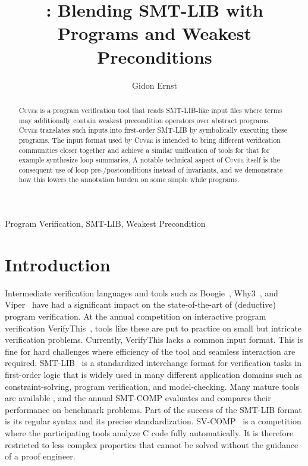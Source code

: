 \documentclass[fleqn]{llncs}
\title{\Cuvee: Blending SMT-LIB with \\ Programs and Weakest Preconditions}
\author{Gidon Ernst}
\institute{LMU Munich, Germany, \email{gidon.ernst@lmu.de}}
\newcommand{\Cuvee}{\textsc{Cuvée}\xspace}
\begin{document}
\maketitle

\begin{abstract}
\Cuvee is a program verification tool that reads SMT-LIB-like input files where terms may additionally contain weakest precondition operators over abstract programs.
\Cuvee translates such inputs into first-order SMT-LIB by symbolically executing these programs.
The input format used by \Cuvee is intended to bring different verification communities closer together and achieve a similar unification of tools for that for example synthesize loop summaries.
A notable technical aspect of \Cuvee itself is the consequent use of loop pre-/postconditions instead of invariants, and we demonstrate how this lowers the annotation burden on some simple while programs.
\end{abstract}

\begin{keywords}
Program Verification, SMT-LIB, Weakest Precondition
\end{keywords}

\section{Introduction}

Intermediate verification languages and tools such as Boogie~\cite{}, Why3~\cite{}, and Viper~\cite{}
have had a significant impact on the state-of-the-art of (deductive) program verification.
At the annual competition on interactive program verification VerifyThis~\cite{},
tools like these are put to practice on small but intricate verification problems.
Currently, VerifyThis lacks a common input format.
This is fine for hard challenges where efficiency of the tool and seamless interaction are required.
SMT-LIB~\cite{} is a standardized interchange format for verification tasks in first-order logic
that is widely used in many different application domains such as constraint-solving, program verification, and model-checking.
Many mature tools are available \cite{}, and the annual SMT-COMP evaluates and compares their performance on benchmark problems.
Part of the success of the SMT-LIB format is its regular syntax and its precise standardization.
SV-COMP~\cite{} is a competition where the participating tools analyze C code fully automatically.
It is therefore restricted to less complex properties that cannot be solved without the guidance of a proof engineer.
\end{document}
